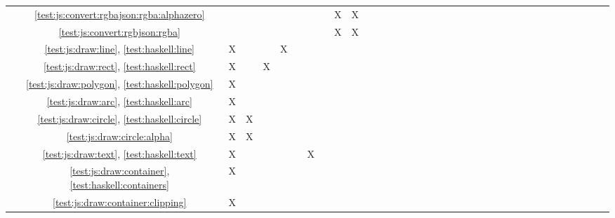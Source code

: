 \begin{tabular}{cc|c|c|c|c|c|c|c|c|c|c|c|c|c|c|c|c|c|c|c|c|c|c|c|c|c|c|c|c|c|c|c|c|c|c|}
\multicolumn{1}{|c|}{} & \ref{test:js:convert:rgbajson:rgba:alphazero}					&   &   &   &   &   &   &   & X & X &   &   &   &   &   &   &   &   &   &   &   &   &   &   &   &   &   &   &   		 \\ \cline{2-30}
\multicolumn{1}{|c|}{} & \ref{test:js:convert:rgbjson:rgba} 							&   &   &   &   &   &   &   & X & X &   &   &   &   &   &   &   &   &   &   &   &   &   &   &   &   &   &   &   		 \\ \cline{2-30}
\multicolumn{1}{|c|}{} & \ref{test:js:draw:line}, \ref{test:haskell:line}				& X &   &   & X &   &   &   &   &   &   &   &   &   &   &   &   &   &   &   &   &   &   &   &   &   &   &   &   		 \\ \cline{2-30}
\multicolumn{1}{|c|}{} & \ref{test:js:draw:rect}, \ref{test:haskell:rect}				& X &   & X &   &   &   &   &   &   &   &   &   &   &   &   &   &   &   &   &   &   &   &   &   &   &   &   &   		 \\ \cline{2-30}
\multicolumn{1}{|c|}{} & \ref{test:js:draw:polygon}, \ref{test:haskell:polygon}			& X &   &   &   &   &   &   &   &   &   &   &   &   &   &   &   &   &   &   &   &   &   &   &   &   &   &   &   		 \\ \cline{2-30}
\multicolumn{1}{|c|}{} & \ref{test:js:draw:arc}, \ref{test:haskell:arc}					& X &   &   &   &   &   &   &   &   &   &   &   &   &   &   &   &   &   &   &   &   &   &   &   &   &   &   &   		 \\ \cline{2-30}
\multicolumn{1}{|c|}{} & \ref{test:js:draw:circle}, \ref{test:haskell:circle}			& X & X &   &   &   &   &   &   &   &   &   &   &   &   &   &   &   &   &   &   &   &   &   &   &   &   &   &   		 \\ \cline{2-30}
\multicolumn{1}{|c|}{} & \ref{test:js:draw:circle:alpha} 								& X & X &   &   &   &   &   &   &   &   &   &   &   &   &   &   &   &   &   &   &   &   &   &   &   &   &   &   		 \\ \cline{2-30}
\multicolumn{1}{|c|}{} & \ref{test:js:draw:text}, \ref{test:haskell:text}				& X &   &   &   &   & X &   &   &   &   &   &   &   &   &   &   &   &   &   &   &   &   &   &   &   &   &   &   		 \\ \cline{2-30}
\multicolumn{1}{|c|}{} & \ref{test:js:draw:container}, \ref{test:haskell:containers}	& X &   &   &   &   &   &   &   &   &   &   &   &   &   &   &   &   &   &   &   &   &   &   &   &   &   &   &   		 \\ \cline{2-30}
\multicolumn{1}{|c|}{} & \ref{test:js:draw:container:clipping} 							& X &   &   &   &   &   &   &   &   &   &   &   &   &   &   &   &   &   &   &   &   &   &   &   &   &   &   &   		 \\ \cline{2-30}

\end{tabular}
